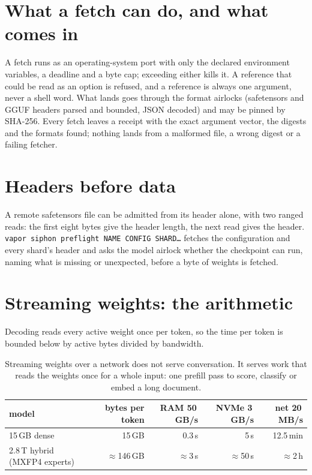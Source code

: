 \section{What a fetch can do, and what comes in}

A fetch runs as an operating-system port with only the declared environment variables, a deadline and
a byte cap; exceeding either kills it. A reference that could be read as an option is refused, and a
reference is always one argument, never a shell word. What lands goes through the format airlocks
(safetensors and GGUF headers parsed and bounded, JSON decoded) and may be pinned by SHA-256. Every fetch
leaves a receipt with the exact argument vector, the digests and the formats found; nothing lands from a
malformed file, a wrong digest or a failing fetcher.

\section{Headers before data}

A remote safetensors file can be admitted from its header alone, with two ranged reads: the first eight
bytes give the header length, the next read gives the header. \texttt{vapor siphon preflight NAME CONFIG
SHARD\ldots} fetches the configuration and every shard's header and asks the model airlock whether the
checkpoint can run, naming what is missing or unexpected, before a byte of weights is fetched.

\section{Streaming weights: the arithmetic}

Decoding reads every active weight once per token, so the time per token is bounded below by active
bytes divided by bandwidth.

\begin{table}[h]
\centering\small
\begin{tabular}{@{}lrrrr@{}}
\toprule
model & bytes per token & RAM 50\,GB/s & NVMe 3\,GB/s & net 20\,MB/s \\
\midrule
15\,GB dense & 15\,GB & 0.3\,s & 5\,s & 12.5\,min \\
2.8\,T hybrid (MXFP4 experts) & $\approx$146\,GB & $\approx$3\,s & $\approx$50\,s & $\approx$2\,h \\
\bottomrule
\end{tabular}
\caption{Streaming weights over a network does not serve conversation. It serves work that reads the
weights once for a whole input: one prefill pass to score, classify or embed a long document.}
\end{table}
